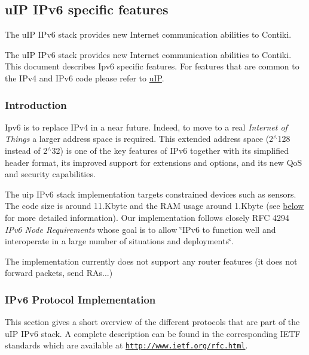 \hypertarget{a00061}{\subsection{u\-I\-P \-I\-Pv6 specific features}
\label{a00061}
}


\-The u\-I\-P \-I\-Pv6 stack provides new \-Internet communication abilities to \-Contiki.  


\-The u\-I\-P \-I\-Pv6 stack provides new \-Internet communication abilities to \-Contiki. \-This document describes \-Ipv6 specific features. \-For features that are common to the \-I\-Pv4 and \-I\-Pv6 code please refer to \hyperlink{a00060}{u\-I\-P}.



\hypertarget{a00061_intro}{}\subsubsection{\-Introduction}\label{a00061_intro}
\-Ipv6 is to replace \-I\-Pv4 in a near future. \-Indeed, to move to a real {\itshape  \-Internet of \-Things \/} a larger address space is required. \-This extended address space (2$^\wedge$128 instead of 2$^\wedge$32) is one of the key features of \-I\-Pv6 together with its simplified header format, its improved support for extensions and options, and its new \-Qo\-S and security capabilities.

\-The uip \-I\-Pv6 stack implementation targets constrained devices such as sensors. \-The code size is around 11.\-Kbyte and the \-R\-A\-M usage around 1.\-Kbyte (see \hyperlink{a00061_size}{below} for more detailed information). \-Our implementation follows closely \-R\-F\-C 4294 {\itshape \-I\-Pv6 \-Node \-Requirements\/} whose goal is to allow \char`\"{}\-I\-Pv6 to function well and
interoperate in a large number of situations and deployments\char`\"{}.

\-The implementation currently does not support any router features (it does not forward packets, send \-R\-As...)



\hypertarget{a00061_protocol}{}\subsubsection{\-I\-Pv6 Protocol Implementation}\label{a00061_protocol}
\-This section gives a short overview of the different protocols that are part of the u\-I\-P \-I\-Pv6 stack. \-A complete description can be found in the corresponding \-I\-E\-T\-F standards which are available at \href{http://www.ietf.org/rfc.html}{\tt http\-://www.\-ietf.\-org/rfc.\-html}.

